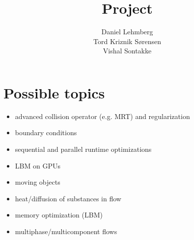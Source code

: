 \documentclass[11pt]{article}
\title{\textbf{Project}}
\author{Daniel Lehmberg\\
		Tord Kriznik Sørensen\\
		Vishal Sontakke}
\date{}
\begin{document}
\maketitle

\section{Possible topics}
\begin{itemize}
\item advanced collision operator (e.g. MRT) and regularization
\item boundary conditions
\item sequential and parallel runtime optimizations
\item LBM on GPUs
\item moving objects
\item heat/diffusion of substances in flow
\item memory optimization (LBM)
\item multiphase/multicomponent flows
\end{itemize}
\end{document}
